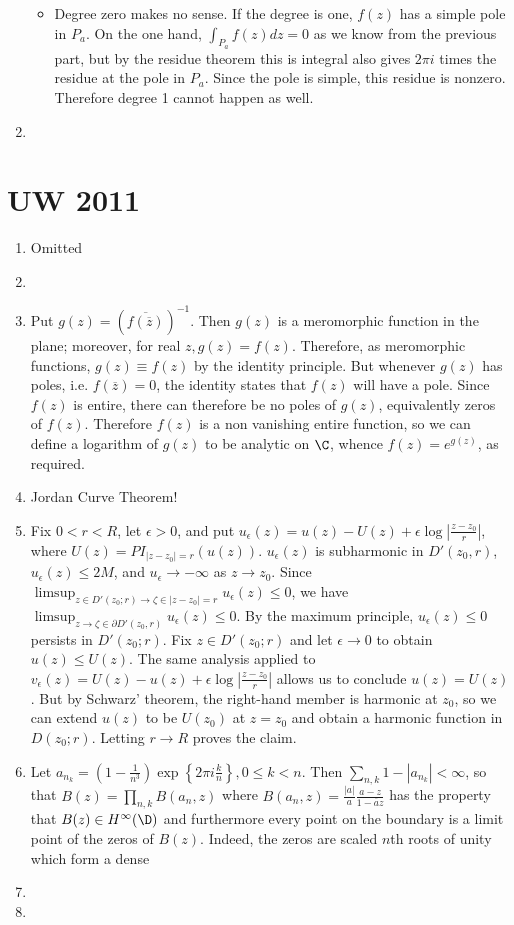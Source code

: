 \documentclass[11pt]{book}
\theoremstyle{definition}
\begin{document}
\begin{enumerate}
\begin{itemize}
\item Degree zero makes no sense. If the degree is one, $f(z)$ has a simple pole in $P_a$. On the one hand, $\int_{P_a}f(z)dz=0$ as we know from the previous part, but by the residue theorem this is integral also gives $2\pi i$ times the residue at the pole in $P_a$. Since the pole is simple, this residue is nonzero. Therefore degree 1 cannot happen as well.
\end{itemize}
\item
\end{enumerate}
\section{UW 2011}
\begin{enumerate}
\item Omitted
\item 
\item Put $g(z)=\left(\overline{f(\overline{z})}\right)^{-1}$. Then $g(z)$ is a meromorphic function in the plane; moreover, for real $z, g(z)=f(z)$. Therefore, as meromorphic functions, $g(z)\equiv f(z)$ by the identity principle. But whenever $g(z)$ has poles, i.e. $f(\overline{z})=0$, the identity states that $f(z)$ will have a pole. Since $f(z)$ is entire, there can therefore be no poles of $g(z)$, equivalently zeros of $f(z)$. Therefore $f(z)$ is a non vanishing entire function, so we can define a logarithm of $g(z)$ to be analytic on $\C$, whence $f(z)=e^{g(z)}$, as required.  
\item Jordan Curve Theorem!
\item Fix $0<r<R$, let $\epsilon>0$, and put $u_{\epsilon}(z)=u(z)-U(z)+\epsilon\log\left|\frac{z-z_0}{r}\right|$, where $U(z)=PI_{|z-z_0|=r}(u(z))$. $u_{\epsilon}(z)$ is subharmonic in $D'(z_0,r)$, $u_{\epsilon}(z)\leq 2M$, and $u_{\epsilon}\to-\infty$ as $z\to z_0$. Since $\limsup_{z\in D'(z_0;r)\to \zeta\in|z-z_0|=r} u_{\epsilon}(z)\leq 0$, we have $\limsup_{z\to \zeta\in\partial D'(z_0,r)} u_{\epsilon}(z)\leq 0$. By the maximum principle, $u_{\epsilon}(z)\leq 0$ persists in $D'(z_0;r)$. Fix $z\in D'(z_0;r)$ and let $\epsilon\to0$ to obtain $u(z)\leq U(z)$. The same analysis applied to $v_{\epsilon}(z)=U(z)-u(z)+\epsilon\log\left|\frac{z-z_0}{r}\right|$ allows us to conclude $u(z)=U(z)$. But by Schwarz' theorem, the right-hand member is harmonic at $z_0$, so we can extend $u(z)$ to be $U(z_0)$ at $z=z_0$ and obtain a harmonic function in $D(z_0;r)$. Letting $r\to R$ proves the claim.
\item Let $a_{n_k}=\left(1-\frac{1}{n^3}\right)\exp\left\{2\pi i\frac{k}{n}\right\}, 0\leq k<n$. Then $\sum_{n,k} 1-|a_{n_k}| < \infty$, so that $B(z)=\prod_{n,k}B(a_n,z)$ where $B(a_n,z)=\frac{|a|}{a}\frac{a-z}{1-\overline{a}z}$ has the property that $B(z)\in H^{\infty}(\D)$ and furthermore every point on the boundary is a limit point of the zeros of $B(z)$. Indeed, the zeros are scaled $n$th roots of unity which form a dense
\item
\item
\end{enumerate}
\end{document}
